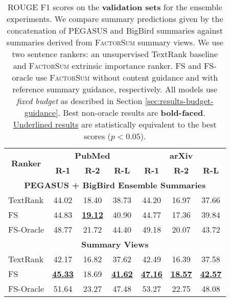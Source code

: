 \documentclass[11pt,table]{article}
\newcommand{\modelname}{FactorSum}
\begin{document}
\begin{table}
  \centering
  \setlength\tabcolsep{1.5pt}
  \begin{tabular}{l|ccc|ccc}
    \toprule
    \multicolumn{1}{c|}{\multirow{2}{1.2cm}{\centering \textbf{Ranker}}} &  \multicolumn{3}{c|}{\textbf{PubMed}} & \multicolumn{3}{c}{\textbf{arXiv}} \\
    \cmidrule(r){2-4} \cmidrule(r){5-7} & \textbf{R-1} & \textbf{R-2} & \textbf{R-L} & \textbf{R-1} & \textbf{R-2} & \textbf{R-L} \\
    \toprule
    \multicolumn{7}{c}{\textbf{PEGASUS + BigBird Ensemble Summaries}} \\
    \midrule
    TextRank & 44.02 & 18.40 & 38.73 & 44.20 & 16.97 & 37.66 \\
    \midrule
    FS & 44.83 & \underline{\textbf{19.12}} & 40.90 & 44.77 & 17.36 & 39.84 \\
    FS-Oracle & 48.77 & 21.72 & 44.40 & 49.18 & 20.07 & 43.72 \\
    \midrule
    \multicolumn{7}{c}{\textbf{Summary Views}} \\
    \midrule
    TextRank & 42.17 & 16.82 & 37.62 & 42.49 & 16.39 & 37.58 \\
    \midrule
    FS & \underline{\textbf{45.33}} & 18.69 & \underline{\textbf{41.62}} & \underline{\textbf{47.16}} & \underline{\textbf{18.57}} & \underline{\textbf{42.57}} \\
    FS-Oracle & 51.64 & 23.27 & 47.48 & 53.27 & 22.75 & 48.08 \\
    \bottomrule
  \end{tabular}
  \caption{ROUGE F1 scores on the \textbf{validation sets} for the ensemble experiments. We compare summary predictions given by the concatenation of PEGASUS and BigBird summaries against summaries derived from \textsc{\modelname} summary views. We use two sentence rankers: an unsupervised TextRank baseline and \textsc{\modelname} extrinsic importance ranker. FS and FS-oracle use \textsc{\modelname} without content guidance and with reference summary guidance, respectively. All models use \emph{fixed budget} as described in Section \ref{sec:results-budget-guidance}. Best non-oracle results are \textbf{bold-faced}. \underline{Underlined results} are statistically equivalent to the best scores ($p<0.05$).}\label{tab:ablation_study_validation}
\end{table}
\end{document}
